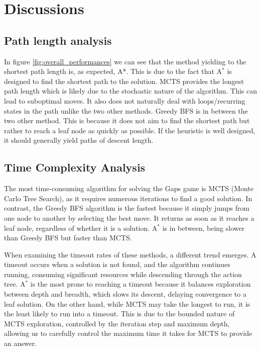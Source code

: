 \chapter{Discussions}
\section{Path length analysis}
In figure \ref{fig:overall_performances} we can see that the method yielding to the shortest path length is, as expected, A*. This is due to the fact that A$^*$ is designed to find the shortest path to the solution. MCTS provides the longest path length which is likely due to the stochastic nature of the algorithm. This can lead to suboptimal moves. It also does not naturally deal with loops/recurring states in the path unlike the two other methods. Greedy BFS is in between the two other method. This is because it does not aim to find the shortest path but rather to reach a leaf node as quickly as possible. If the heuristic is well designed, it should generally yield paths of descent length.

\section{Time Complexity Analysis}

The most time-consuming algorithm for solving the Gaps game is MCTS (Monte Carlo Tree Search), as it requires numerous iterations to find a good solution. In contrast, the Greedy BFS algorithm is the fastest because it simply jumps from one node to another by selecting the best move. It returns as soon as it reaches a leaf node, regardless of whether it is a solution. A$^*$ is in between, being slower than Greedy BFS but faster than MCTS.

When examining the timeout rates of these methods, a different trend emerges. A timeout occurs when a solution is not found, and the algorithm continues running, consuming significant resources while descending through the action tree. A$^*$ is the most prone to reaching a timeout because it balances exploration between depth and breadth, which slows its descent, delaying convergence to a leaf solution. On the other hand, while MCTS may take the longest to run, it is the least likely to run into a timeout. This is due to the bounded nature of MCTS exploration, controlled by the iteration step and maximum depth, allowing us to carefully control the maximum time it takes for MCTS to provide an answer.


